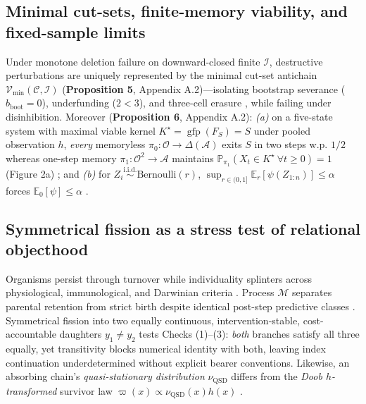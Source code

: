 \documentclass[12pt,letterpaper]{article}
\begin{document}
\subsection{Minimal cut-sets, finite-memory viability, and fixed-sample
limits}\label{minimal-cut-sets-finite-memory-viability-and-fixed-sample-limits}

Under monotone deletion failure on downward-closed finite
\(\mathcal{I}\), destructive perturbations are uniquely represented by
the minimal cut-set antichain
\(\mathcal{V}_{\min}(\mathcal{C}, \mathcal{I})\) (\textbf{Proposition
5}, Appendix A.2)---isolating bootstrap severance
(\(b_{\mathrm{boot}}=0\)), underfunding (\(2 < 3\)), and three-cell
erasure \citep{coverThomas2006}, while failing under disinhibition.
Moreover (\textbf{Proposition 6}, Appendix A.2): \emph{(a)} on a
five-state system with maximal viable kernel
\(K^\star = \operatorname{gfp}(F_S) = S\) under pooled observation
\(h\), \emph{every} memoryless
\(\pi_0: \mathcal{O} \to \Delta(\mathcal{A})\) exits \(S\) in two steps
w.p. \(1/2\) whereas one-step memory
\(\pi_1: \mathcal{O}^2 \to \mathcal{A}\) maintains
\(\mathbb{P}_{\pi_1}(X_t \in K^\star\ \forall t \ge 0) = 1\) (Figure 2a)
\citep{kaelbling1998, papadimitriouTsitsiklis1987, sethTsakiris2018};
and \emph{(b)} for
\(Z_i \stackrel{\mathrm{i.i.d.}}{\sim} \mathrm{Bernoulli}(r)\),
\(\sup_{r \in (0,1]} \mathbb{E}_r[\psi(Z_{1:n})] \le \alpha\) forces
\(\mathbb{E}_0[\psi] \le \alpha\) \citep{leCam1973, mayo2018}.

\subsection{Symmetrical fission as a stress test of relational
objecthood}\label{symmetrical-fission-as-a-stress-test-of-relational-objecthood}

Organisms persist through turnover while individuality splinters across
physiological, immunological, and Darwinian criteria
\citep{whitehead1929, clarke2010, godfreySmith2009, pradeu2012, maynardSmithSzathmary1995, dupreNicholson2018}.
Process \(\mathcal{M}\) separates parental retention from strict birth
despite identical post-step predictive classes \citep{wiggins2001}.
Symmetrical fission into two equally continuous, intervention-stable,
cost-accountable daughters \(y_1 \neq y_2\) \citep{parfit1984} tests
Checks (1)--(3): \emph{both} branches satisfy all three equally, yet
transitivity blocks numerical identity with both, leaving index
continuation underdetermined without explicit bearer conventions.
Likewise, an absorbing chain's \emph{quasi-stationary distribution}
\(\nu_{\mathrm{QSD}}\) differs from the \emph{Doob \(h\)-transformed}
survivor law \(\varpi(x) \propto \nu_{\mathrm{QSD}}(x)h(x)\)
\citep{doob1957, darrochSeneta1965, collet2013, cuciniello2026}.
\end{document}
